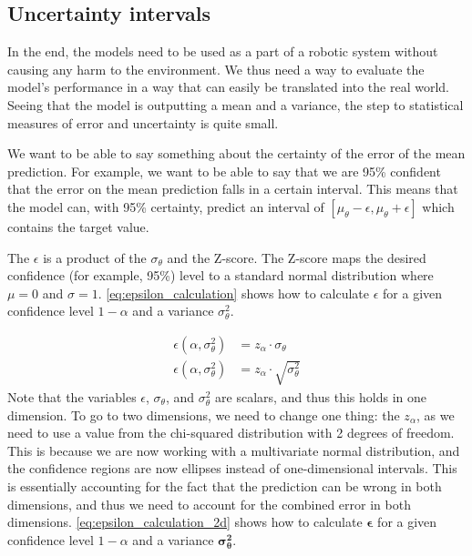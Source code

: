 \subsection{Uncertainty intervals}\label{ch:experiments_section:evaluation-metrics_subsection:uncertainty-intervals}
In the end, the models need to be used as a part of a robotic system without causing any harm to the environment.
We thus need a way to evaluate the model's performance in a way that can easily be translated into the real world.
Seeing that the model is outputting a mean and a variance, the step to statistical measures of error and uncertainty is quite small.

We want to be able to say something about the certainty of the error of the mean prediction.
For example, we want to be able to say that we are 95\% confident that the error on the mean prediction falls in a certain interval.
This means that the model can, with 95\% certainty, predict an interval of $[\mu_\theta - \epsilon, \mu_\theta + \epsilon]$ which contains the target value.

The $\epsilon$ is a product of the $\sigma_\theta$ and the Z-score. 
The Z-score maps the desired confidence (for example, 95\%) level to a standard normal distribution where $\mu=0$ and $\sigma=1$.
\cref{eq:epsilon_calculation} shows how to calculate $\epsilon$ for a given confidence level $1-\alpha$ and a variance $\sigma^2_\theta$.

\begin{subequations}\label{eq:epsilon_calculation}
    \begin{align}
        \epsilon(\alpha, \sigma^2_\theta) &= z_\alpha \cdot \sigma_\theta \\
        \epsilon(\alpha, \sigma^2_\theta) &= z_\alpha \cdot \sqrt{\sigma^2_\theta}
    \end{align}
\end{subequations}
Note that the variables $\epsilon$, $\sigma_\theta$, and $\sigma^2_\theta$ are scalars, and thus this holds in one dimension.
To go to two dimensions, we need to change one thing: the $z_\alpha$, as we need to use a value from the chi-squared distribution with 2 degrees of freedom.
This is because we are now working with a multivariate normal distribution, and the confidence regions are now ellipses instead of one-dimensional intervals.
This is essentially accounting for the fact that the prediction can be wrong in both dimensions, and thus we need to account for the combined error in both dimensions.
\cref{eq:epsilon_calculation_2d} shows how to calculate $\bm{\epsilon}$ for a given confidence level $1-\alpha$ and a variance $\bm{\sigma^2_\theta}$.

